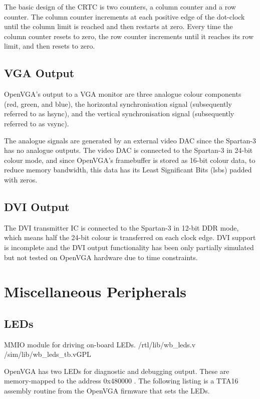 The basic design of the CRTC is two counters, a column counter and a row counter.
The column counter increments at each positive edge of the dot-clock until the
column limit is reached and then restarts at zero. Every time the column counter
resets to zero, the row counter increments until it reaches its row limit, and
then resets to zero.


\subsection{VGA Output}
\label{VIDEO_VGA_Output}

OpenVGA's output to a VGA monitor are three analogue colour components (red,
green, and blue), the horizontal synchronisation signal (subsequently referred to
as hsync), and the vertical synchronisation signal (subsequently referred to as
vsync).

The analogue signals are generated by an external video DAC since the Spartan-3
has no analogue outputs. The video DAC is connected to the Spartan-3 in 24-bit
colour mode, and since OpenVGA's framebuffer is stored as 16-bit colour data, to
reduce memory bandwidth, this data has its Least Significant Bits (\gls{lsb}s)
padded with zeros.


\subsection{DVI Output}
\label{VIDEO_DVI_Output}

The DVI transmitter IC is connected to the Spartan-3 in 12-bit DDR mode, which
means half the 24-bit colour is transferred on each clock edge. DVI support is
incomplete and the DVI output functionality has been only partially simulated but
not tested on OpenVGA hardware due to time constraints.


\section{Miscellaneous Peripherals}

\subsection{LEDs}
\label{LED_Driver}

{MMIO module for driving on-board LEDs.} {/rtl/lib/wb\_leds.v}
{/sim/lib/wb\_leds\_tb.v}{GPL}

OpenVGA has two LEDs for diagnostic and debugging output. These are memory-mapped
to the address 0x480000 . The following listing is a TTA16 assembly routine from
the OpenVGA firmware that sets the LEDs.

